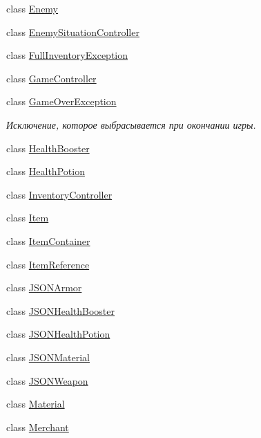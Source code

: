\begin{DoxyCompactItemize}
class \hyperlink{class_a_s_c_i_i_wars_1_1_game_1_1_enemy}{Enemy}
\item 
class \hyperlink{class_a_s_c_i_i_wars_1_1_game_1_1_enemy_situation_controller}{Enemy\+Situation\+Controller}
\item 
class \hyperlink{class_a_s_c_i_i_wars_1_1_game_1_1_full_inventory_exception}{Full\+Inventory\+Exception}
\item 
class \hyperlink{class_a_s_c_i_i_wars_1_1_game_1_1_game_controller}{Game\+Controller}
\item 
class \hyperlink{class_a_s_c_i_i_wars_1_1_game_1_1_game_over_exception}{Game\+Over\+Exception}
\begin{DoxyCompactList}\small\item\em Исключение, которое выбрасывается при окончании игры. \end{DoxyCompactList}\item 
class \hyperlink{class_a_s_c_i_i_wars_1_1_game_1_1_health_booster}{Health\+Booster}
\item 
class \hyperlink{class_a_s_c_i_i_wars_1_1_game_1_1_health_potion}{Health\+Potion}
\item 
class \hyperlink{class_a_s_c_i_i_wars_1_1_game_1_1_inventory_controller}{Inventory\+Controller}
\item 
class \hyperlink{class_a_s_c_i_i_wars_1_1_game_1_1_item}{Item}
\item 
class \hyperlink{class_a_s_c_i_i_wars_1_1_game_1_1_item_container}{Item\+Container}
\item 
class \hyperlink{class_a_s_c_i_i_wars_1_1_game_1_1_item_reference}{Item\+Reference}
\item 
class \hyperlink{class_a_s_c_i_i_wars_1_1_game_1_1_j_s_o_n_armor}{J\+S\+O\+N\+Armor}
\item 
class \hyperlink{class_a_s_c_i_i_wars_1_1_game_1_1_j_s_o_n_health_booster}{J\+S\+O\+N\+Health\+Booster}
\item 
class \hyperlink{class_a_s_c_i_i_wars_1_1_game_1_1_j_s_o_n_health_potion}{J\+S\+O\+N\+Health\+Potion}
\item 
class \hyperlink{class_a_s_c_i_i_wars_1_1_game_1_1_j_s_o_n_material}{J\+S\+O\+N\+Material}
\item 
class \hyperlink{class_a_s_c_i_i_wars_1_1_game_1_1_j_s_o_n_weapon}{J\+S\+O\+N\+Weapon}
\item 
class \hyperlink{class_a_s_c_i_i_wars_1_1_game_1_1_material}{Material}
\item 
class \hyperlink{class_a_s_c_i_i_wars_1_1_game_1_1_merchant}{Merchant}
\item 

\end{DoxyCompactItemize}
